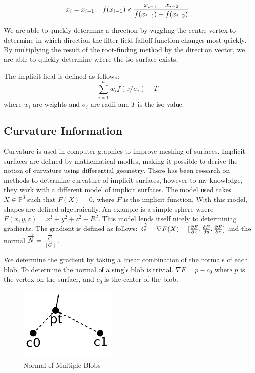 \documentclass[conference]{acmsiggraph}
\begin{document}
$$x_i = x_{i-1} - f(x_{i-1}) \times {{x_{i-1} - x_{i-2}}\over{f(x_{i-1}) -
f(x_{i-2})}}$$

We are able to quickly determine a direction by wiggling
the centre vertex to determine in which direction the filter field falloff
function changes most quickly. By multiplying the result of the root-finding
method by the direction vector, we are able to quickly determine where the
iso-surface exists.

The implicit field is defined as follows:
$$\sum\limits_{i=1}^n w_i f(x / \sigma_i ) - T$$
where $w_i$ are weights and $\sigma_i$ are radii and $T$ is the iso-value.


\subsection{Curvature Information}
Curvature is used in computer graphics to improve meshing of surfaces. Implicit
surfaces are defined by mathematical modles, making it possible to derive the
notion of curvature using differential geometry. There has been research on
methods to determine curvature\cite{DeAraujo2004} of implicit surfaces, however
to my knowledge, they work with a different model of implicit surfaces. The
model used takes $X \in \mathbb{R}^3$ such that $F(X) = 0$, where $F$ is the
implicit function. With this model, shapes are defined algebraically. An
example is a simple sphere where $F(x, y, z) = x^2 + y ^ 2 + z ^2 - R^2$. This
model lends itself nicely to determining gradients. The gradient is defined as
follows: $\overrightarrow{G} = \nabla F(X) = [{\partial F\over\partial x},
{\partial F \over \partial y}, {\partial F \over \partial z}]$ and the normal
$\overrightarrow{N} = {\overrightarrow{G} \over ||\overrightarrow{G}||}$.

We determine the gradient by taking a linear combination of the normals of each
blob. To determine the normal of a single blob is trivial. $\nabla F = p - c_0$
where $p$ is the vertex on the surface, and $c_0$ is the center of the
blob. 

\begin{figure}
	\centering
	\includegraphics{images/Normal.pdf}
	\caption{Normal of Multiple Blobs}
\end{figure}
\end{document}
